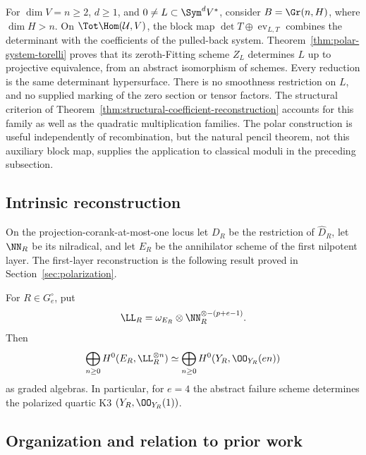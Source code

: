 For \(\dim V=n\ge2\), \(d\ge1\), and
\(0\ne L\subset\Sym^dV^*\), consider \(B=\Gr(n,H)\),
where \(\dim H>n\).  On \(\Tot\Hom(\mathcal U,V)\), the
block map \(\det T\oplus\operatorname{ev}_{L,T}\) combines
the determinant with the coefficients of the pulled-back system.
Theorem~\ref{thm:polar-system-torelli} proves that its zeroth-Fitting
scheme \(Z_L\) determines \(L\) up to projective equivalence,
from an abstract isomorphism of schemes.  Every reduction is the same
determinant hypersurface.  There is no smoothness restriction on
\(L\), and no supplied marking of the zero section or tensor factors.
The structural criterion of
Theorem~\ref{thm:structural-coefficient-reconstruction} accounts for
this family as well as the quadratic multiplication families.
The polar construction is useful independently of recombination, but
the natural pencil theorem, not this auxiliary block map, supplies
the application to classical moduli in the preceding subsection.

\subsection{Intrinsic reconstruction}

On the projection-corank-at-most-one locus let \(D_R\) be the
restriction of \(\widehat D_R\), let \(\NN_R\) be its
nilradical, and let \(E_R\) be the annihilator scheme of the first
nilpotent layer.  The first-layer reconstruction is the following result
proved in Section~\ref{sec:polarization}.

\begin{theorem}
\label{thm:main-reconstruction}
For \(R\in G_e^\circ\), put
\[
 \LL_R=\omega_{E_R}\otimes
 \NN_R^{\otimes-(p+e-1)}.
\]
Then
\[
 \bigoplus_{n\ge0}H^0(E_R,\LL_R^{\otimes n})
 \simeq
 \bigoplus_{n\ge0}H^0(Y_R,\OO_{Y_R}(en))
\]
as graded algebras.  In particular, for \(e=4\) the abstract
failure scheme determines the polarized quartic K3
\((Y_R,\OO_{Y_R}(1))\).
\end{theorem}


\subsection{Organization and relation to prior work}

